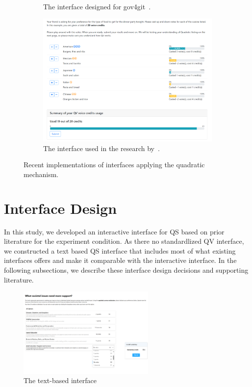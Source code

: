 \begin{figure}[h]
\begin{subfigure}[b]{0.3\textwidth}
        \caption{The interface designed for gov4git~\cite{Gov4gitDecentralizedPlatform2023}.}
        \label{fig:gov4gitInterface}
    \end{subfigure}
    \begin{subfigure}[b]{0.3\textwidth}
        \centering
        \includegraphics[width=\textwidth]{content/image/curr_interface/cheng_qv.png}
        \caption{The interface used in the research by~\textcite{chengCanShowWhat2021}.}
        \label{fig:chengInterface}
    \end{subfigure}
    \caption{Recent implementations of interfaces applying the quadratic mechanism.}
    \label{fig:qv_interface_external}
\end{figure}

\section{Interface Design}
\label{sec:interfaceDesign}
In this study, we developed an interactive interface for QS based on prior literature for the experiment condition. As there no standardlized QV interface, we constructed a text based QS interface that includes most of what existing interfaces offers and make it comparable with the interactive interface. In the following subsections, we describe these interface design decisions and supporting literature.

\begin{figure}[H]
    \centering
    \includegraphics[width=0.6\textwidth]{content/image/text_interface.png}
    \caption{The text-based interface}
    \label{fig:textInterface}
\end{figure}

